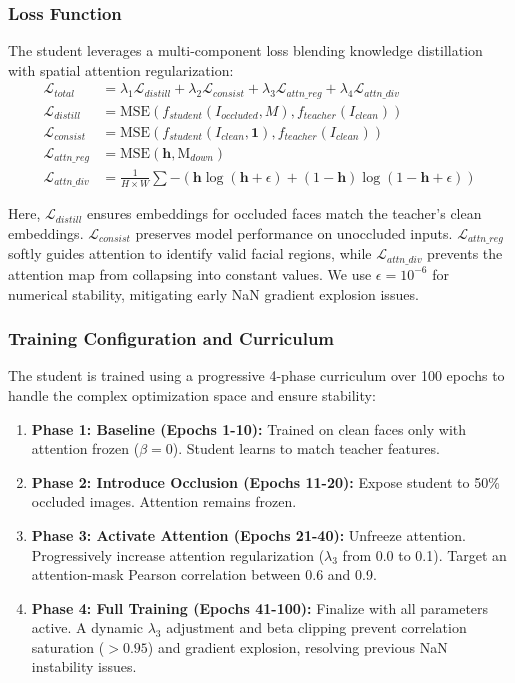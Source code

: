 \documentclass[10pt,twocolumn]{article}
\begin{document}
\subsubsection{Loss Function}
The student leverages a multi-component loss blending knowledge distillation with spatial attention regularization:
\begin{align}
\mathcal{L}_{total} &= \lambda_1 \mathcal{L}_{distill} + \lambda_2 \mathcal{L}_{consist} + \lambda_3 \mathcal{L}_{attn\_reg} + \lambda_4 \mathcal{L}_{attn\_div} \\
\mathcal{L}_{distill} &= \text{MSE}(f_{student}(I_{occluded}, M), f_{teacher}(I_{clean})) \\
\mathcal{L}_{consist} &= \text{MSE}(f_{student}(I_{clean}, \mathbf{1}), f_{teacher}(I_{clean})) \\
\mathcal{L}_{attn\_reg} &= \text{MSE}(\mathbf{h}, \text{M}_{down}) \\
\mathcal{L}_{attn\_div} &= \frac{1}{H \times W} \sum -(\mathbf{h} \log(\mathbf{h} + \epsilon) + (1-\mathbf{h}) \log(1-\mathbf{h} + \epsilon))
\end{align}

Here, $\mathcal{L}_{distill}$ ensures embeddings for occluded faces match the teacher's clean embeddings. $\mathcal{L}_{consist}$ preserves model performance on unoccluded inputs. $\mathcal{L}_{attn\_reg}$ softly guides attention to identify valid facial regions, while $\mathcal{L}_{attn\_div}$ prevents the attention map from collapsing into constant values. We use $\epsilon = 10^{-6}$ for numerical stability, mitigating early NaN gradient explosion issues.

\subsubsection{Training Configuration and Curriculum}
The student is trained using a progressive 4-phase curriculum over 100 epochs to handle the complex optimization space and ensure stability:
\begin{enumerate}
    \item \textbf{Phase 1: Baseline (Epochs 1-10):} Trained on clean faces only with attention frozen ($\beta=0$). Student learns to match teacher features.
    \item \textbf{Phase 2: Introduce Occlusion (Epochs 11-20):} Expose student to 50\% occluded images. Attention remains frozen.
    \item \textbf{Phase 3: Activate Attention (Epochs 21-40):} Unfreeze attention. Progressively increase attention regularization ($\lambda_3$ from 0.0 to 0.1). Target an attention-mask Pearson correlation between 0.6 and 0.9.
    \item \textbf{Phase 4: Full Training (Epochs 41-100):} Finalize with all parameters active. A dynamic $\lambda_3$ adjustment and beta clipping prevent correlation saturation ($>0.95$) and gradient explosion, resolving previous NaN instability issues.
\end{enumerate}
\end{document}
